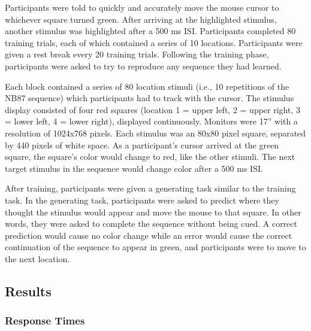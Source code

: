 \documentclass[man,floatsintext]{apa6}
\begin{document}
Participants were told to quickly and accurately move the mouse cursor to whichever square turned green. After arriving at the highlighted stimulus, another stimulus was highlighted after a 500 ms ISI. Participants completed 80 training trials, each of which contained a series of 10 locations. Participants were given a rest break every 20 training trials. Following the training phase, participants were asked to try to reproduce any sequence they had learned.

Each block contained a series of 80 location stimuli (i.e., 10 repetitions of the NB87 sequence) which participants had to track with the cursor. The stimulus display consisted of four red squares (location 1 = upper left, 2 = upper right, 3 = lower left, 4 = lower right), displayed continuously. Monitors were 17'' with a resolution of 1024x768 pixels. Each stimulus was an 80x80 pixel square, separated by 440 pixels of white space. As a participant's cursor arrived at the green square, the square's color would change to red, like the other stimuli. The next target stimulus in the sequence would change color after a 500 ms ISI.

After training, participants were given a generating task similar to the training task. In the generating task, participants were asked to predict where they thought the stimulus would appear and move the mouse to that square. In other words, they were asked to complete the sequence without being cued. A correct prediction would cause no color change while an error would cause the correct continuation of the sequence to appear in green, and participants were to move to the next location. 

\subsection{Results}

\subsubsection{Response Times}
\end{document}
